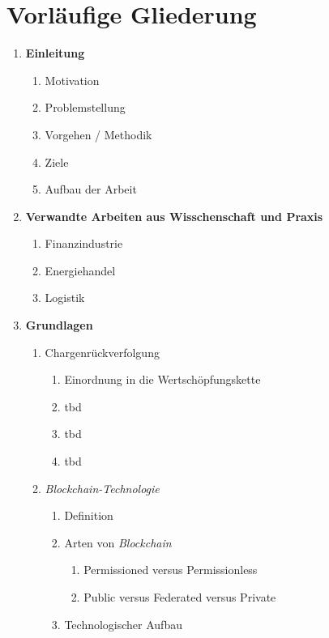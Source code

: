 \section{Vorläufige Gliederung}
\begin{small}
  \begin{enumerate}
    \item \textbf{Einleitung}
    \begin{enumerate}[label*=\arabic*.]
      \item Motivation
      \item Problemstellung
      \item Vorgehen / Methodik
      \item Ziele
      \item Aufbau der Arbeit
    \end{enumerate}
    \item \textbf{Verwandte Arbeiten aus Wisschenschaft und Praxis}
    \begin{enumerate}[label*=\arabic*.]
      \item Finanzindustrie
      \item Energiehandel
      \item Logistik
    \end{enumerate}
    \item \textbf{Grundlagen}
    \begin{enumerate}[label*=\arabic*.]
      \item Chargenrückverfolgung
      \begin{enumerate}[label*=\arabic*.]
        \item Einordnung in die Wertschöpfungskette
        \item tbd
        \item tbd
        \item tbd
      \end{enumerate}
      \item \textit{Blockchain-Technologie}
      \begin{enumerate}[label*=\arabic*.]
        \item Definition
        \item Arten von \textit{Blockchain}
        \begin{enumerate}[label*=\arabic*.]
          \item Permissioned versus Permissionless
          \item Public versus Federated versus Private
        \end{enumerate}
        \item Technologischer Aufbau

\end{enumerate}
\end{enumerate}
\end{enumerate}
\end{small}
